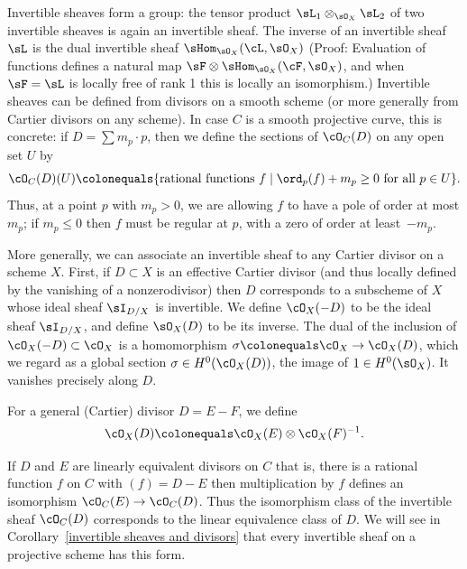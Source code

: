 Invertible sheaves form a group: the tensor product
$\sL_1\otimes_{\sO_X}\sL_2$ of two invertible sheaves is  again an invertible sheaf.
The
inverse of an invertible sheaf $\sL$ is  the dual invertible sheaf $\sHom_{\sO_X}(\cL,\sO_X)$
(Proof: Evaluation of functions defines a natural map $\sF \otimes  \sHom_{\sO_X}(\cF,\sO_X)$,
and when $\sF = \sL$ is locally free of rank 1 this is locally an isomorphism.)
Invertible sheaves can be defined from divisors on a smooth scheme (or more generally from Cartier divisors on any scheme). In case $C$ is a smooth projective curve, this is concrete: if $D = \sum m_p \cdot p$, then we define the sections of $\cO_C(D)$ on any open set $U$ by
$$
\cO_C(D)(U) \colonequals \{ \text{rational functions } f \mid \ord_p(f) + m_p \geq 0 \text{ for all } p \in U \}.
$$
Thus, at a point $p$ with $m_p > 0$, we are allowing $f$ to have a pole of order at most $m_p$; if $m_p \leq 0$ then $f$ must be regular at $p$, with a zero of order at least~$-m_p$.

More generally, we can associate an invertible sheaf to any
Cartier divisor
%
on a scheme $X$.
First, if
 $D\subset X$ is an effective Cartier divisor (and thus locally defined by the vanishing of a nonzerodivisor) then
$D$ corresponds to a subscheme of $X$ whose ideal sheaf $\sI_{D/X}$
is invertible. We define $\cO_X(-D)$ to be the ideal sheaf $\sI_{D/X}$, and define $\sO_{X}(D)$ to be
its inverse. The dual of the inclusion of
$\cO_X(-D) \subset \cO_X$ is a homomorphism $\sigma \colonequals \cO_X \to
\cO_X(D)$,
which
we regard as a global section $\sigma \in H^0(\cO_X(D))$, the image of $1\in H^0(\sO_X)$. It
vanishes precisely along $D$.

For a general (Cartier) divisor $D = E - F$, we define
$$
\cO_X(D) \colonequals \cO_X(E) \otimes \cO_X(F)^{-1}.
$$

If $D$ and $E$ are linearly equivalent divisors on $C$ \emdash that is,
there is a rational function $f$ on $C$ with $(f) = D - E$ \emdash
then multiplication by $f$ defines an isomorphism
$\cO_C(E) \to \cO_C(D)$.
Thus the isomorphism class of the invertible sheaf $\cO_C(D)$
corresponds to the linear equivalence class of $D$. We will see
in Corollary~\ref{invertible sheaves and divisors}
that every invertible sheaf on a projective scheme has this form.

